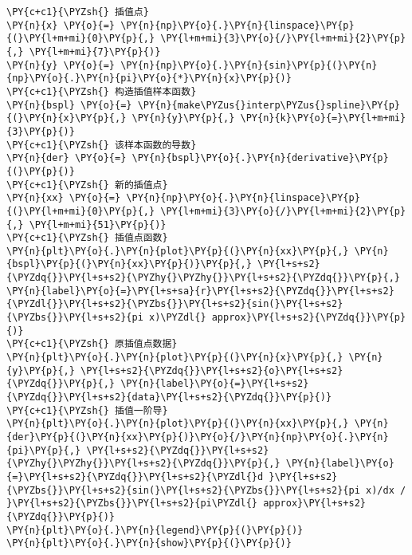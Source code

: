     \begin{tcolorbox}[breakable, size=fbox, boxrule=1pt, pad at break*=1mm,colback=cellbackground, colframe=cellborder]
\begin{Verbatim}[commandchars=\\\{\}]
\PY{c+c1}{\PYZsh{} 插值点}
\PY{n}{x} \PY{o}{=} \PY{n}{np}\PY{o}{.}\PY{n}{linspace}\PY{p}{(}\PY{l+m+mi}{0}\PY{p}{,} \PY{l+m+mi}{3}\PY{o}{/}\PY{l+m+mi}{2}\PY{p}{,} \PY{l+m+mi}{7}\PY{p}{)}
\PY{n}{y} \PY{o}{=} \PY{n}{np}\PY{o}{.}\PY{n}{sin}\PY{p}{(}\PY{n}{np}\PY{o}{.}\PY{n}{pi}\PY{o}{*}\PY{n}{x}\PY{p}{)}
\PY{c+c1}{\PYZsh{} 构造插值样本函数}
\PY{n}{bspl} \PY{o}{=} \PY{n}{make\PYZus{}interp\PYZus{}spline}\PY{p}{(}\PY{n}{x}\PY{p}{,} \PY{n}{y}\PY{p}{,} \PY{n}{k}\PY{o}{=}\PY{l+m+mi}{3}\PY{p}{)}
\PY{c+c1}{\PYZsh{} 该样本函数的导数}
\PY{n}{der} \PY{o}{=} \PY{n}{bspl}\PY{o}{.}\PY{n}{derivative}\PY{p}{(}\PY{p}{)}
\PY{c+c1}{\PYZsh{} 新的插值点}
\PY{n}{xx} \PY{o}{=} \PY{n}{np}\PY{o}{.}\PY{n}{linspace}\PY{p}{(}\PY{l+m+mi}{0}\PY{p}{,} \PY{l+m+mi}{3}\PY{o}{/}\PY{l+m+mi}{2}\PY{p}{,} \PY{l+m+mi}{51}\PY{p}{)}
\PY{c+c1}{\PYZsh{} 插值点函数}
\PY{n}{plt}\PY{o}{.}\PY{n}{plot}\PY{p}{(}\PY{n}{xx}\PY{p}{,} \PY{n}{bspl}\PY{p}{(}\PY{n}{xx}\PY{p}{)}\PY{p}{,} \PY{l+s+s2}{\PYZdq{}}\PY{l+s+s2}{\PYZhy{}\PYZhy{}}\PY{l+s+s2}{\PYZdq{}}\PY{p}{,} \PY{n}{label}\PY{o}{=}\PY{l+s+sa}{r}\PY{l+s+s2}{\PYZdq{}}\PY{l+s+s2}{\PYZdl{}}\PY{l+s+s2}{\PYZbs{}}\PY{l+s+s2}{sin(}\PY{l+s+s2}{\PYZbs{}}\PY{l+s+s2}{pi x)\PYZdl{} approx}\PY{l+s+s2}{\PYZdq{}}\PY{p}{)}
\PY{c+c1}{\PYZsh{} 原插值点数据}
\PY{n}{plt}\PY{o}{.}\PY{n}{plot}\PY{p}{(}\PY{n}{x}\PY{p}{,} \PY{n}{y}\PY{p}{,} \PY{l+s+s2}{\PYZdq{}}\PY{l+s+s2}{o}\PY{l+s+s2}{\PYZdq{}}\PY{p}{,} \PY{n}{label}\PY{o}{=}\PY{l+s+s2}{\PYZdq{}}\PY{l+s+s2}{data}\PY{l+s+s2}{\PYZdq{}}\PY{p}{)}
\PY{c+c1}{\PYZsh{} 插值一阶导}
\PY{n}{plt}\PY{o}{.}\PY{n}{plot}\PY{p}{(}\PY{n}{xx}\PY{p}{,} \PY{n}{der}\PY{p}{(}\PY{n}{xx}\PY{p}{)}\PY{o}{/}\PY{n}{np}\PY{o}{.}\PY{n}{pi}\PY{p}{,} \PY{l+s+s2}{\PYZdq{}}\PY{l+s+s2}{\PYZhy{}\PYZhy{}}\PY{l+s+s2}{\PYZdq{}}\PY{p}{,} \PY{n}{label}\PY{o}{=}\PY{l+s+s2}{\PYZdq{}}\PY{l+s+s2}{\PYZdl{}d }\PY{l+s+s2}{\PYZbs{}}\PY{l+s+s2}{sin(}\PY{l+s+s2}{\PYZbs{}}\PY{l+s+s2}{pi x)/dx / }\PY{l+s+s2}{\PYZbs{}}\PY{l+s+s2}{pi\PYZdl{} approx}\PY{l+s+s2}{\PYZdq{}}\PY{p}{)}
\PY{n}{plt}\PY{o}{.}\PY{n}{legend}\PY{p}{(}\PY{p}{)}
\PY{n}{plt}\PY{o}{.}\PY{n}{show}\PY{p}{(}\PY{p}{)}
\end{Verbatim}
\end{tcolorbox}

    \begin{center}
    \end{center}
    { \hspace*{\fill} \\}
